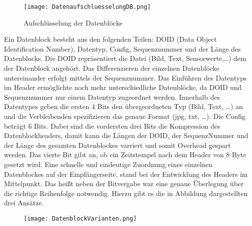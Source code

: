 \begin{figure}[H]
	\centering
	\texttt{[image: DatenaufschluesselungDB.png]}
	\caption{Aufschlüsselung der Datenblöcke}
  \label{fig:DatenaufschluesselungDB}
\end{figure}

Ein Datenblock besteht aus den folgenden Teilen: DOID (Data Object
Identification Number), Datentyp, Config, Sequenznummer und der Länge des Datenblocks. Die DOID
repräsentiert die Datei (Bild, Text, Sensorwerte,\ldots) dem der Datenblock
angehört. Das Differenzieren der einzelnen Datenblöcke untereinander erfolgt
mittels der Sequenznummer. Das Einführen des Datentyps im Header ermöglichte
noch mehr unterschiedliche Datenblöcke, da DOID und Sequenznummer nur einem
Datentyp zugeordnet werden.
Innerhalb des Datentypes geben die ersten $4$ Bits den übergeordneten Typ (Bild,
Text, \ldots) an und die Verbleibenden spezifizieren das genaue Format (jpg, txt, \ldots).
Die Config beträgt $6$ Bits. Dabei sind die vordersten drei Bits die Kompression
des Datenblockheaders, damit kann die Längen der DOID, der SequenzNummer und
der Länge des gesamten Datenblockes varriert und somit Overhead gespart werden.
Das vierte Bit gibt an, ob ein Zeitstempel nach dem Header von $8$
Byte gesetzt wird.
 Eine schnelle und eindeutige
Zuordnung eines einzelnen Datenblockes auf der Empfängerseite, stand bei der Entwicklung des Headers im Mittelpunkt. Das heißt
neben der Bitvergabe war eine genaue Überlegung über die richtige Reihenfolge
notwendig. Hierzu gibt es die in Abbildung dargestellten drei Ansätze.

\begin{figure}[H]
	\centering
	\texttt{[image: DatenblockVarianten.png]}
\end{figure}

